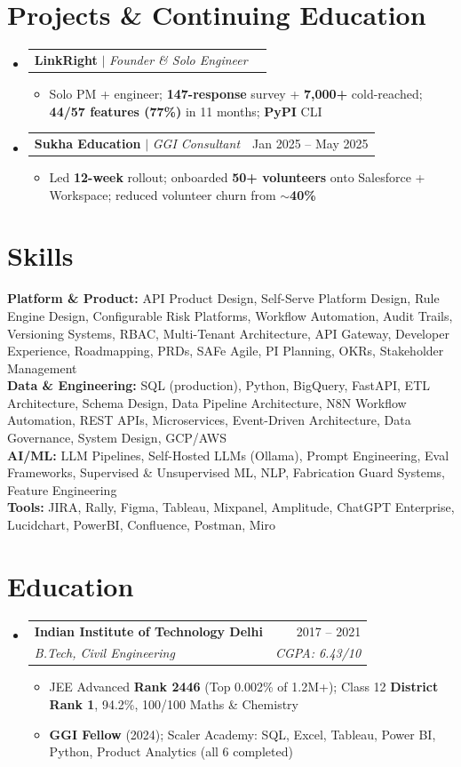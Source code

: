 \documentclass[a4paper,10pt]{article}
\makeatletter
\newcommand{\resumeItem}[1]{
  \item\small{#1\vspace{-2pt}}
}
\newcommand{\resumeSubheading}[4]{
  \vspace{-2pt}\item
  \begin{tabular*}{0.97\textwidth}[t]{l@{\extracolsep{\fill}}r}
    \textbf{#1} & #2 \\
    \textit{\small#3} & \textit{\small #4} \\
  \end{tabular*}\vspace{-7pt}
}
\newcommand{\resumeProjectHeading}[2]{
  \item
  \begin{tabular*}{0.97\textwidth}{l@{\extracolsep{\fill}}r}
    \small#1 & #2 \\
  \end{tabular*}\vspace{-7pt}
}
\newcommand{\resumeSubHeadingListStart}{\begin{itemize}[leftmargin=0.15in, label={}]}
\newcommand{\resumeSubHeadingListEnd}{\end{itemize}}
\newcommand{\resumeItemListStart}{\begin{itemize}\parfillskip=0pt}
\newcommand{\resumeItemListEnd}{\end{itemize}\vspace{-5pt}}
\makeatother
\begin{document}
\section{Projects \& Continuing Education}
\resumeSubHeadingListStart
  \resumeProjectHeading
    {\textbf{LinkRight} $|$ \emph{Founder \& Solo Engineer}}{}
  \resumeItemListStart
    \resumeItem{Solo PM + engineer; \textbf{147-response} survey + \textbf{7,000+} cold-reached; \textbf{44/57 features (77\%)} in 11 months; \textbf{PyPI} CLI}
  \resumeItemListEnd
  \resumeProjectHeading
    {\textbf{Sukha Education} $|$ \emph{GGI Consultant}}{Jan 2025 -- May 2025}
  \resumeItemListStart
    \resumeItem{Led \textbf{12-week} rollout; onboarded \textbf{50+ volunteers} onto Salesforce + Workspace; reduced volunteer churn from \textbf{$\sim$40\%}}
  \resumeItemListEnd
\resumeSubHeadingListEnd

\section{Skills}
\begin{itemize}[leftmargin=0.15in, label={}]
  \small{\item{
    \textbf{Platform \& Product:}{ API Product Design, Self-Serve Platform Design, Rule Engine Design, Configurable Risk Platforms, Workflow Automation, Audit Trails, Versioning Systems, RBAC, Multi-Tenant Architecture, API Gateway, Developer Experience, Roadmapping, PRDs, SAFe Agile, PI Planning, OKRs, Stakeholder Management} \\
    \textbf{Data \& Engineering:}{ SQL (production), Python, BigQuery, FastAPI, ETL Architecture, Schema Design, Data Pipeline Architecture, N8N Workflow Automation, REST APIs, Microservices, Event-Driven Architecture, Data Governance, System Design, GCP/AWS} \\
    \textbf{AI/ML:}{ LLM Pipelines, Self-Hosted LLMs (Ollama), Prompt Engineering, Eval Frameworks, Supervised \& Unsupervised ML, NLP, Fabrication Guard Systems, Feature Engineering} \\
    \textbf{Tools:}{ JIRA, Rally, Figma, Tableau, Mixpanel, Amplitude, ChatGPT Enterprise, Lucidchart, PowerBI, Confluence, Postman, Miro}
  }}
\end{itemize}

\section{Education}
\resumeSubHeadingListStart
  \resumeSubheading
    {Indian Institute of Technology Delhi}{2017 -- 2021}
    {B.Tech, Civil Engineering}{CGPA: 6.43/10}
  \resumeItemListStart
    \resumeItem{JEE Advanced \textbf{Rank 2446} (Top 0.002\% of 1.2M+); Class 12 \textbf{District Rank 1}, 94.2\%, 100/100 Maths \& Chemistry}
    \resumeItem{\textbf{GGI Fellow} (2024); Scaler Academy: SQL, Excel, Tableau, Power BI, Python, Product Analytics (all 6 completed)}
  \resumeItemListEnd
\resumeSubHeadingListEnd
\end{document}
